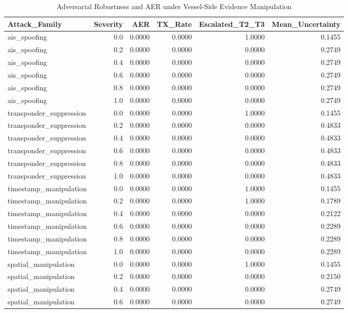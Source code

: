 \begin{table}[htbp]
\centering
\caption{Adversarial Robustness and AER under Vessel-Side Evidence Manipulation}
\begin{tabular}{lrrrrr}
\toprule
Attack\_Family & Severity & AER & TX\_Rate & Escalated\_T2\_T3 & Mean\_Uncertainty \\
\midrule
ais\_spoofing & 0.0 & 0.0000 & 0.0000 & 1.0000 & 0.1455 \\
ais\_spoofing & 0.2 & 0.0000 & 0.0000 & 0.0000 & 0.2749 \\
ais\_spoofing & 0.4 & 0.0000 & 0.0000 & 0.0000 & 0.2749 \\
ais\_spoofing & 0.6 & 0.0000 & 0.0000 & 0.0000 & 0.2749 \\
ais\_spoofing & 0.8 & 0.0000 & 0.0000 & 0.0000 & 0.2749 \\
ais\_spoofing & 1.0 & 0.0000 & 0.0000 & 0.0000 & 0.2749 \\
transponder\_suppression & 0.0 & 0.0000 & 0.0000 & 1.0000 & 0.1455 \\
transponder\_suppression & 0.2 & 0.0000 & 0.0000 & 0.0000 & 0.4833 \\
transponder\_suppression & 0.4 & 0.0000 & 0.0000 & 0.0000 & 0.4833 \\
transponder\_suppression & 0.6 & 0.0000 & 0.0000 & 0.0000 & 0.4833 \\
transponder\_suppression & 0.8 & 0.0000 & 0.0000 & 0.0000 & 0.4833 \\
transponder\_suppression & 1.0 & 0.0000 & 0.0000 & 0.0000 & 0.4833 \\
timestamp\_manipulation & 0.0 & 0.0000 & 0.0000 & 1.0000 & 0.1455 \\
timestamp\_manipulation & 0.2 & 0.0000 & 0.0000 & 1.0000 & 0.1789 \\
timestamp\_manipulation & 0.4 & 0.0000 & 0.0000 & 0.0000 & 0.2122 \\
timestamp\_manipulation & 0.6 & 0.0000 & 0.0000 & 0.0000 & 0.2289 \\
timestamp\_manipulation & 0.8 & 0.0000 & 0.0000 & 0.0000 & 0.2289 \\
timestamp\_manipulation & 1.0 & 0.0000 & 0.0000 & 0.0000 & 0.2289 \\
spatial\_manipulation & 0.0 & 0.0000 & 0.0000 & 1.0000 & 0.1455 \\
spatial\_manipulation & 0.2 & 0.0000 & 0.0000 & 0.0000 & 0.2150 \\
spatial\_manipulation & 0.4 & 0.0000 & 0.0000 & 0.0000 & 0.2749 \\
spatial\_manipulation & 0.6 & 0.0000 & 0.0000 & 0.0000 & 0.2749 \\

\end{tabular}
\end{table}
